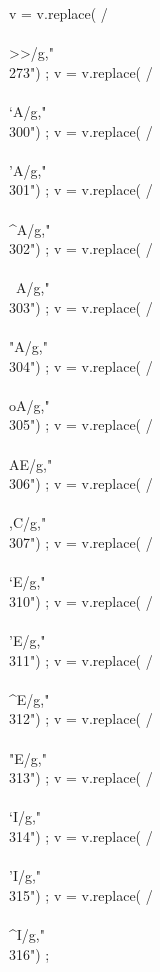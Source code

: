 {      v = v.replace(  /\\\\>>/g,"\\273") ;
      v = v.replace(  /\\\\`A/g,"\\300") ;
      v = v.replace(  /\\\\'A/g,"\\301") ;
      v = v.replace(  /\\\\^A/g,"\\302") ;
      v = v.replace(  /\\\\~A/g,"\\303") ;
      v = v.replace(  /\\\\"A/g,"\\304") ;
      v = v.replace(  /\\\\oA/g,"\\305") ;
      v = v.replace(  /\\\\AE/g,"\\306") ;
      v = v.replace(  /\\\\,C/g,"\\307") ;
      v = v.replace(  /\\\\`E/g,"\\310") ;
      v = v.replace(  /\\\\'E/g,"\\311") ;
      v = v.replace(  /\\\\^E/g,"\\312") ;
      v = v.replace(  /\\\\"E/g,"\\313") ;
      v = v.replace(  /\\\\`I/g,"\\314") ;
      v = v.replace(  /\\\\'I/g,"\\315") ;
      v = v.replace(  /\\\\^I/g,"\\316") ;
}

